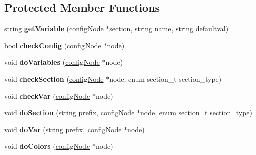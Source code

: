 \subsection*{Protected Member Functions}
\begin{DoxyCompactItemize}
\item 
string {\bfseries get\+Variable} (\hyperlink{classconfigNode}{config\+Node} $\ast$section, string name, string defaultval)\hypertarget{classVegaConfig_a2c31731523e3a95116bd8ec9cfd15e48}{}\label{classVegaConfig_a2c31731523e3a95116bd8ec9cfd15e48}

\item 
bool {\bfseries check\+Config} (\hyperlink{classconfigNode}{config\+Node} $\ast$node)\hypertarget{classVegaConfig_a9f6fe82bf6bb25975edfad56319d86d2}{}\label{classVegaConfig_a9f6fe82bf6bb25975edfad56319d86d2}

\item 
void {\bfseries do\+Variables} (\hyperlink{classconfigNode}{config\+Node} $\ast$node)\hypertarget{classVegaConfig_a9e9306e28c0889e906674b1875c977fe}{}\label{classVegaConfig_a9e9306e28c0889e906674b1875c977fe}

\item 
void {\bfseries check\+Section} (\hyperlink{classconfigNode}{config\+Node} $\ast$node, enum section\+\_\+t section\+\_\+type)\hypertarget{classVegaConfig_a4c7e939f59ccbcf2bee09d864ebee939}{}\label{classVegaConfig_a4c7e939f59ccbcf2bee09d864ebee939}

\item 
void {\bfseries check\+Var} (\hyperlink{classconfigNode}{config\+Node} $\ast$node)\hypertarget{classVegaConfig_ab5090ff07c6d7a3f51c8e8c0f9310381}{}\label{classVegaConfig_ab5090ff07c6d7a3f51c8e8c0f9310381}

\item 
void {\bfseries do\+Section} (string prefix, \hyperlink{classconfigNode}{config\+Node} $\ast$node, enum section\+\_\+t section\+\_\+type)\hypertarget{classVegaConfig_abc3baaa604eeb839940aea70dc9a1ebe}{}\label{classVegaConfig_abc3baaa604eeb839940aea70dc9a1ebe}

\item 
void {\bfseries do\+Var} (string prefix, \hyperlink{classconfigNode}{config\+Node} $\ast$node)\hypertarget{classVegaConfig_ad5b0cc5182c0ae3340417e79a117a3cb}{}\label{classVegaConfig_ad5b0cc5182c0ae3340417e79a117a3cb}

\item 
void {\bfseries do\+Colors} (\hyperlink{classconfigNode}{config\+Node} $\ast$node)\hypertarget{classVegaConfig_ae33e8359931c62bcfd8d62ee728cf816}{}\label{classVegaConfig_ae33e8359931c62bcfd8d62ee728cf816}


\end{DoxyCompactItemize}
